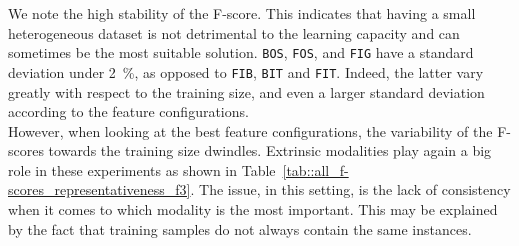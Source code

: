         \begin{figure}[htbp]
        \end{figure}
            
        We note the high stability of the F-score.
        This indicates that having a small heterogeneous dataset is not detrimental to the learning capacity and can sometimes be the most suitable solution.
        \texttt{BOS}, \texttt{FOS}, and \texttt{FIG} have a standard deviation under \SI{2}{\percent}, as opposed to \texttt{FIB}, \texttt{BIT} and \texttt{FIT}.
        Indeed, the latter vary greatly with respect to the training size, and even a larger standard deviation according to the feature configurations.\\

        However, when looking at the best feature configurations, the variability of the F-scores towards the training size dwindles.
        Extrinsic modalities play again a big role in these experiments as shown in Table~\ref{tab::all_f-scores_representativeness_f3}.
        The issue, in this setting, is the lack of consistency when it comes to which modality is the most important.
        This may be explained by the fact that training samples do not always contain the same instances.\\

